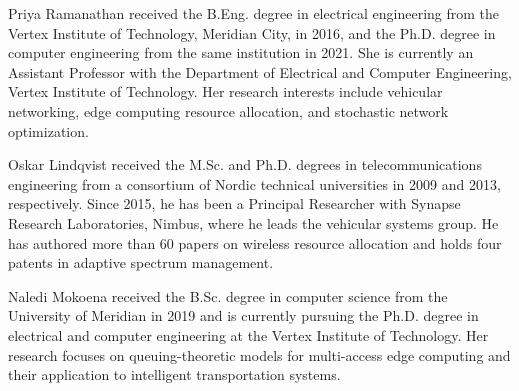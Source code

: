 \documentclass[journal,10pt]{IEEEtran}
\begin{document}
\begin{IEEEbiographynophoto}{Priya Ramanathan}
received the B.Eng. degree in electrical engineering from the Vertex Institute of Technology, Meridian City, in 2016, and the Ph.D. degree in computer engineering from the same institution in 2021. She is currently an Assistant Professor with the Department of Electrical and Computer Engineering, Vertex Institute of Technology. Her research interests include vehicular networking, edge computing resource allocation, and stochastic network optimization.
\end{IEEEbiographynophoto}

\begin{IEEEbiographynophoto}{Oskar Lindqvist}
received the M.Sc. and Ph.D. degrees in telecommunications engineering from a consortium of Nordic technical universities in 2009 and 2013, respectively. Since 2015, he has been a Principal Researcher with Synapse Research Laboratories, Nimbus, where he leads the vehicular systems group. He has authored more than 60 papers on wireless resource allocation and holds four patents in adaptive spectrum management.
\end{IEEEbiographynophoto}

\begin{IEEEbiographynophoto}{Naledi Mokoena}
received the B.Sc. degree in computer science from the University of Meridian in 2019 and is currently pursuing the Ph.D. degree in electrical and computer engineering at the Vertex Institute of Technology. Her research focuses on queuing-theoretic models for multi-access edge computing and their application to intelligent transportation systems.
\end{IEEEbiographynophoto}
\end{document}
